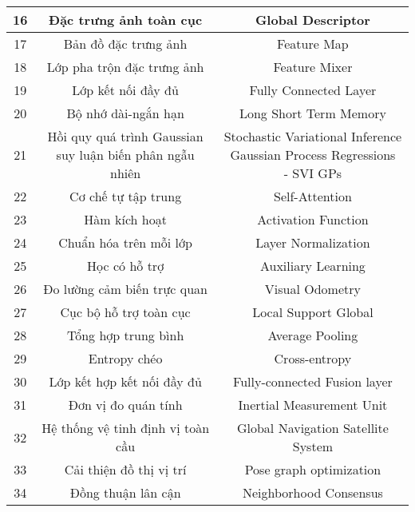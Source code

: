 \begin{table}[h]
\begin{tabular}{|c|c|c|}
16           & Đặc trưng ảnh toàn cục                         & Global Descriptor           \\ \hline
17           & Bản đồ đặc trưng ảnh                         & Feature Map           \\ \hline
18           & Lớp pha trộn đặc trưng ảnh                         & Feature Mixer           \\ \hline
19          & Lớp kết nối đầy đủ        & Fully Connected Layer \\ \hline
20          & Bộ nhớ dài-ngắn hạn       & Long Short Term Memory \\ \hline
21          & \makecell{Hồi quy quá trình Gaussian \\ suy luận biến phân ngẫu nhiên} & \makecell{Stochastic Variational Inference \\ Gaussian Process Regressions \\ - SVI GPs} \\ \hline
22          & Cơ chế tự tập trung       &   Self-Attention \\ \hline
23          & Hàm kích hoạt       &   Activation Function \\ \hline
24          & Chuẩn hóa trên mỗi lớp      &   Layer Normalization \\ \hline
25          & Học có hỗ trợ     & Auxiliary Learning    \\ \hline
26          & Đo lường cảm biến trực quan   & Visual Odometry       \\ \hline
27          & Cục bộ hỗ trợ toàn cục        & Local Support Global  \\ \hline
28         & Tổng hợp trung bình        & Average Pooling  \\ \hline
29         & Entropy chéo               & Cross-entropy    \\ \hline
30         & Lớp kết hợp kết nối đầy đủ  & Fully-connected Fusion layer \\ \hline
31         & Đơn vị đo quán tính & Inertial Measurement Unit \\ \hline
32         & Hệ thống vệ tinh định vị toàn cầu & Global Navigation Satellite System \\ \hline
33         & Cải thiện đồ thị vị trí    & Pose graph optimization   \\ \hline
34	    & Đồng thuận lân cận	& Neighborhood Consensus		\\ \hline
\end{tabular}
\end{table}

